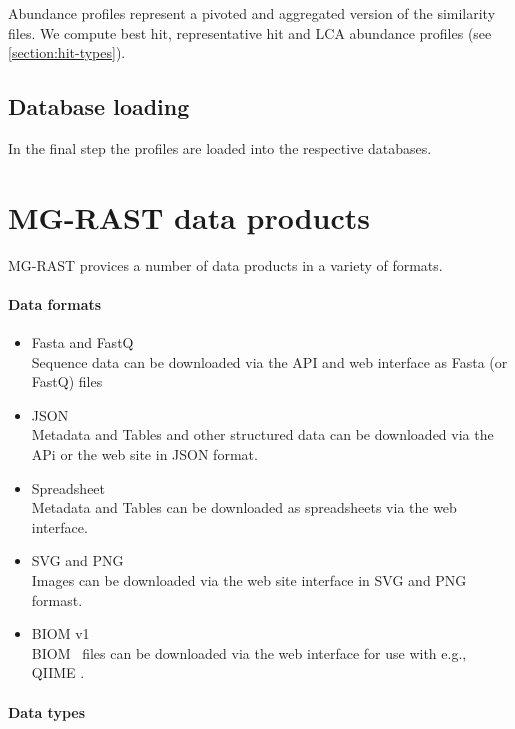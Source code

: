 \documentclass[12pt,fullpage]{report}
\begin{document}
Abundance profiles represent a pivoted and aggregated version of the similarity files. We compute best hit, representative hit and LCA abundance profiles (see \ref{section:hit-types}).


\section{Database loading}

In the final step the profiles are loaded into the respective databases.


\chapter{MG-RAST data products}


MG-RAST provices a number of data products in a variety of formats.

\subsubsection*{Data formats}

\begin{itemize}
\item Fasta and FastQ\\
Sequence data can be downloaded via the API and web interface as Fasta (or FastQ) files
\item JSON \\
Metadata and Tables and other structured data can be downloaded via the APi or the web site in JSON format.
\item Spreadsheet\\
Metadata and Tables can be downloaded as spreadsheets via the web interface.
\item SVG and PNG\\
Images can be downloaded via the web site interface in SVG and PNG formast.
\item BIOM v1\\
BIOM~\cite{BIOM}  files can be downloaded via the web interface for use with e.g., QIIME \cite{QIIME}.
\end{itemize}

\subsubsection*{Data types}
\end{document}
